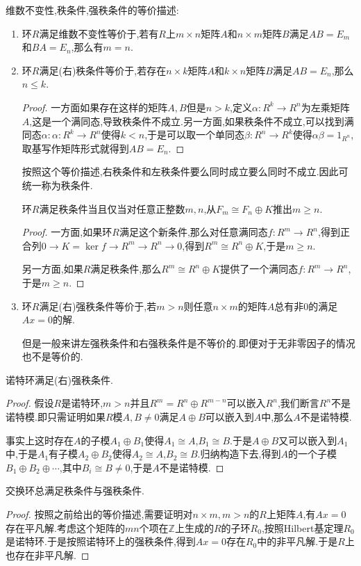 维数不变性,秩条件,强秩条件的等价描述:
\begin{enumerate}
	\item 环$R$满足维数不变性等价于,若有$R$上$m\times n$矩阵$A$和$n\times m$矩阵$B$满足$AB=E_m$和$BA=E_n$,那么有$m=n$.
	\item 环$R$满足(右)秩条件等价于,若存在$n\times k$矩阵$A$和$k\times n$矩阵$B$满足$AB=E_n$,那么$n\le k$.
	\begin{proof}
		
		一方面如果存在这样的矩阵$A,B$但是$n>k$,定义$\alpha:R^k\to R^n$为左乘矩阵$A$,这是一个满同态,导致秩条件不成立.另一方面,如果秩条件不成立,可以找到满同态$\alpha:\alpha:R^k\to R^n$使得$k<n$,于是可以取一个单同态$\beta:R^n\to R^k$使得$\alpha\beta=1_{R^n}$,取基写作矩阵形式就得到$AB=E_n$.
	\end{proof}
	
	按照这个等价描述,右秩条件和左秩条件要么同时成立要么同时不成立.因此可统一称为秩条件.
	
	环$R$满足秩条件当且仅当对任意正整数$m,n$,从$F_m\cong F_n\oplus K$推出$m\ge n$.
	\begin{proof}
		
		一方面,如果环$R$满足这个新条件,那么对任意满同态$f:R^m\to R^n$,得到正合列$0\to K=\ker f\to R^m\to R^n\to0$,得到$R^m\cong R^n\oplus K$,于是$m\ge n$.
		
		另一方面,如果$R$满足秩条件,那么$R^m\cong R^n\oplus K$提供了一个满同态$f:R^m\to R^n$,于是$m\ge n$.
	\end{proof}
	\item 环$R$满足(右)强秩条件等价于,若$m>n$则任意$n\times m$的矩阵$A$总有非0的满足$Ax=0$的解.
	
	但是一般来讲左强秩条件和右强秩条件是不等价的.即便对于无非零因子的情况也不是等价的.
\end{enumerate}

诺特环满足(右)强秩条件.
\begin{proof}
	
	假设$R$是诺特环,$m>n$并且$R^m=R^n\oplus R^{m-n}$可以嵌入$R^n$,我们断言$R^n$不是诺特模.即只需证明如果$R$模$A,B\not=0$满足$A\oplus B$可以嵌入到$A$中,那么$A$不是诺特模.
	
	事实上这时存在$A$的子模$A_1\oplus B_1$使得$A_1\cong A$,$B_1\cong B$.于是$A\oplus B$又可以嵌入到$A_1$中,于是$A_1$有子模$A_2\oplus B_2$使得$A_2\cong A$,$B_2\cong B$.归纳构造下去,得到$A$的一个子模$B_1\oplus B_2\oplus\cdots$,其中$B_i\cong B\not=0$,于是$A$不是诺特模.
\end{proof}

交换环总满足秩条件与强秩条件.
\begin{proof}
	
	按照之前给出的等价描述,需要证明对$n\times m,m>n$的$R$上矩阵$A$,有$Ax=0$存在平凡解.考虑这个矩阵的$mn$个项在$\mathbb{Z}$上生成的$R$的子环$R_0$,按照Hilbert基定理$R_0$是诺特环.于是按照诺特环上的强秩条件,得到$Ax=0$存在$R_0$中的非平凡解.于是$R$上也存在非平凡解.
\end{proof}
\newpage
